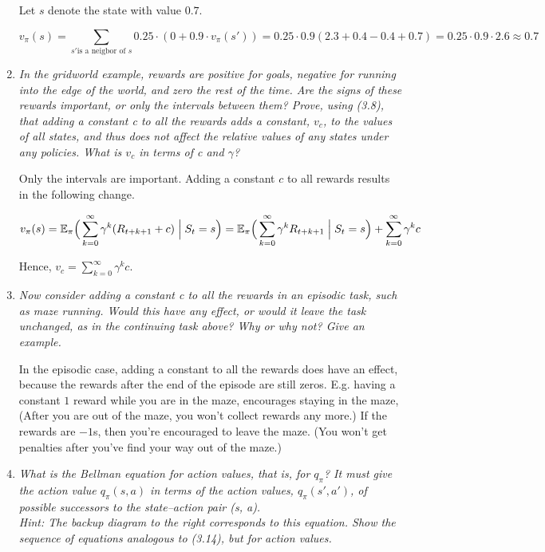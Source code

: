 \documentclass[12pt,a4paper]{article}
\begin{document}
\begin{enumerate}
  Let $s$ denote the state with value $0.7$.

  \[v_\pi(s) = \sum\limits_{s' \text{is a neigbor of } s} 0.25 \cdot  (0 + 0.9 \cdot v_\pi(s')) =
  0.25 \cdot 0.9(2.3 + 0.4 - 0.4 + 0.7) = 0.25 \cdot 0.9 \cdot 2.6 \approx 0.7\]

\item
  \textit{In the gridworld example, rewards are positive for goals, negative for
  running into the edge of the world, and zero the rest of the time. Are the signs of these
  rewards important, or only the intervals between them? Prove, using (3.8), that adding a
  constant c to all the rewards adds a constant, $v_c$, to the values of all states, and thus
  does not affect the relative values of any states under any policies. What is $v_c$ in terms
  of c and $\gamma$?}

  Only the intervals are important. Adding a constant $c$ to all rewards results in
  the following change.

  \[
  v_\pi(s) = \mathbb{E}_\pi \Big(\sum\limits_{k = 0}^\infty \gamma^k (R_{t + k + 1} + c) \Bigm\lvert S_t = s\Big)
  = \mathbb{E}_\pi \Big(\sum\limits_{k = 0}^\infty \gamma^k R_{t + k + 1} \Bigm\lvert S_t = s\Big) +
  \sum\limits_{k = 0}^\infty \gamma^k c
  \]

  Hence, $v_c = \sum\limits_{k = 0}^\infty \gamma^k c$.

\item
  \textit{Now consider adding a constant c to all the rewards in an episodic task,
  such as maze running. Would this have any effect, or would it leave the task unchanged,
  as in the continuing task above? Why or why not? Give an example.}

  In the episodic case, adding a constant to all the rewards does have an effect,
  because the rewards after the end of the episode are still zeros. E.g. having a constant
  $1$ reward while you are in the maze, encourages staying in the maze, (After you are
  out of the maze, you won't collect rewards any more.) If the rewards are $-1$s, then
  you're encouraged to leave the maze. (You won't get penalties after you've find
  your way out of the maze.)

\item
  \textit{What is the Bellman equation for action values, that is, for $q_\pi$?
  It must give the action value $q_\pi(s, a)$ in terms of the action values, $q_\pi(s', a')$,
  of possible successors to the state–action pair (s, a).\\
  Hint: The backup diagram to the right corresponds to this equation.
  Show the sequence of equations analogous to (3.14), but for action
  values.}


\end{enumerate}
\end{document}
